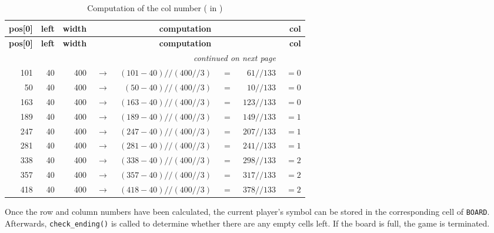 \begin{longtable}{rrrcrcrr}
	\caption{Computation of the col number ( in )}\label{tabColNumber}\\
	\toprule
	\textbf{pos[0]} & \textbf{left} & \textbf{width} & \multicolumn{4}{c}{\textbf{computation}} & \textbf{col}\\
	\midrule
	\endfirsthead
	
	\toprule
	\textbf{pos[0]} & \textbf{left} & \textbf{width} & \multicolumn{4}{c}{\textbf{computation}} & \textbf{col}\\
	\midrule
	\endhead
	
	\midrule
	\multicolumn{7}{r}{\emph{continued on next page}} \\
	\endfoot
	
	\bottomrule
	\endlastfoot
	
	101 & 40 & 400 & $\:\rightarrow\:$ & $(101 - 40) // (400 // 3)$ & $\:=\:$ & $61  // 133$ & $\:=0$ \\
	50  & 40 & 400 & $\:\rightarrow\:$ & $(50 - 40)  // (400 // 3)$ & $\:=\:$ & $10  // 133$ & $\:=0$ \\
	163 & 40 & 400 & $\:\rightarrow\:$ & $(163 - 40) // (400 // 3)$ & $\:=\:$ & $123 // 133$ & $\:=0$ \\
	189 & 40 & 400 & $\:\rightarrow\:$ & $(189 - 40) // (400 // 3)$ & $\:=\:$ & $149 // 133$ & $\:=1$ \\
	247 & 40 & 400 & $\:\rightarrow\:$ & $(247 - 40) // (400 // 3)$ & $\:=\:$ & $207 // 133$ & $\:=1$ \\
	281 & 40 & 400 & $\:\rightarrow\:$ & $(281 - 40) // (400 // 3)$ & $\:=\:$ & $241 // 133$ & $\:=1$ \\
	338 & 40 & 400 & $\:\rightarrow\:$ & $(338 - 40) // (400 // 3)$ & $\:=\:$ & $298 // 133$ & $\:=2$ \\
	357 & 40 & 400 & $\:\rightarrow\:$ & $(357 - 40) // (400 // 3)$ & $\:=\:$ & $317 // 133$ & $\:=2$ \\
	418 & 40 & 400 & $\:\rightarrow\:$ & $(418 - 40) // (400 // 3)$ & $\:=\:$ & $378 // 133$ & $\:=2$ \\
\end{longtable}

Once the row and column numbers have been calculated, the current player's symbol can be stored in the corresponding cell of \texttt{BOARD}. Afterwards, \texttt{check\_ending()} is called to determine whether there are any empty cells left. If the board is full, the game is terminated.



